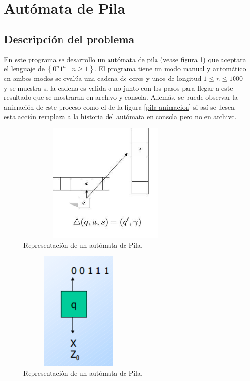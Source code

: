 \section{Autómata de Pila}
	\subsection{Descripción del problema}
	En este programa se desarrollo un autómata de pila (vease figura \ref{fig:diagrama-pila}) que aceptara el lenguaje de $ \left\lbrace 0^{n}1^{n} \mid n\geq 1\right\rbrace  $. El programa tiene un modo manual y automático en ambos modos se evalúa una cadena de ceros y unos de longitud $1 \le n \le 1000 $ y se muestra si la cadena es valida o no junto con los pasos para llegar a este resultado que se mostraran en archivo y consola.
	Además, se puede observar la animación de este proceso como el de la figura \ref{pila-animacion} si así se desea, esta acción remplaza a la historia del autómata en consola pero no en archivo.
	\begin{figure}[H]
		\begin{center}
		\includegraphics[width=9cm, height=6cm]{img/automata-pila.png}
		\caption{Representación de un autómata de Pila.}
		\label{fig:diagrama-pila}
		\end{center}
	\end{figure}
	\begin{figure}[H]
		\begin{center}
			\includegraphics[width=6cm, height=6cm]{img/animacion-pila.png}
			\caption{Representación de un autómata de Pila.}
			\label{fig:pila-animacion}
		\end{center}
	\end{figure}
